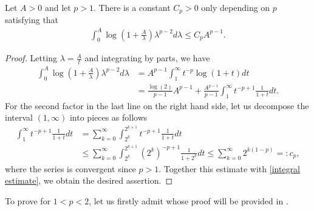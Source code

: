 \documentclass[leqno]{amsart}
\begin{document}
\begin{lemma}\label{integral estimate lemma}
Let $A>0$ and let $p>1$. There is a constant $C_{p}>0$ only depending on $p$ satisfying that
\begin{align*}
\int_{0}^{A}\log(1+\frac{A}{\lambda})\lambda^{p-2}d\lambda\leq C_{p}A^{p-1}.
\end{align*}
\end{lemma}
\begin{proof}
Letting $\lambda=\frac{A}{t}$ and integrating by parts, we have
\begin{align}\label{integral estimate}
\nonumber\int_{0}^{A}\log(1+\frac{A}{\lambda})\lambda^{p-2}d\lambda
&=A^{p-1}\int_{1}^{\infty}t^{-p}\log(1+t)dt\\
&=\frac{\log(2)}{p-1}A^{p-1}+
\frac{A^{p-1}}{p-1}\int_{1}^{\infty}t^{-p+1}\frac{1}{1+t}dt.
\end{align}
For the second factor in the last line on the right hand side, let us decompose the interval $(1,\infty)$ into pieces as follows
\begin{align*}
\int_{1}^{\infty}t^{-p+1}\frac{1}{1+t}dt
&=\sum_{k=0}^{\infty}\int_{2^k}^{2^{k+1}}t^{-p+1}\frac{1}{1+t}dt\\
&\leq \sum_{k=0}^{\infty}\int_{2^{k}}^{2^{k+1}}(2^{k})^{-p+1}\frac{1}{1+2^{k}}dt\leq\sum_{k=0}^{\infty}2^{k(1-p)}=:c_{p},
\end{align*}
where the series is convergent since $p>1$. Together this estimate with \eqref{integral estimate}, we obtain the desired assertion.

\end{proof}


To prove  for $1<p<2$, let us firstly admit  whose proof will be provided in . 
\end{document}
